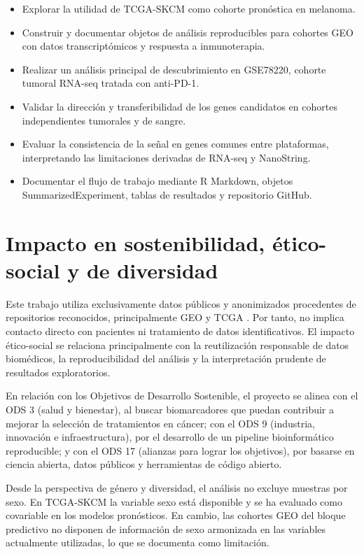 \begin{itemize}
    \item Explorar la utilidad de TCGA-SKCM como cohorte pronóstica en melanoma.
    \item Construir y documentar objetos de análisis reproducibles para cohortes GEO con datos transcriptómicos y respuesta a inmunoterapia.
    \item Realizar un análisis principal de descubrimiento en GSE78220, cohorte tumoral RNA-seq tratada con anti-PD-1.
    \item Validar la dirección y transferibilidad de los genes candidatos en cohortes independientes tumorales y de sangre.
    \item Evaluar la consistencia de la señal en genes comunes entre plataformas, interpretando las limitaciones derivadas de RNA-seq y NanoString.
    \item Documentar el flujo de trabajo mediante R Markdown, objetos SummarizedExperiment, tablas de resultados y repositorio GitHub.
\end{itemize}

\section{Impacto en sostenibilidad, ético-social y de diversidad}
\label{s:etic}

Este trabajo utiliza exclusivamente datos públicos y anonimizados procedentes de repositorios reconocidos, principalmente GEO y TCGA \cite{GEO,TCGA}. Por tanto, no implica contacto directo con pacientes ni tratamiento de datos identificativos. El impacto ético-social se relaciona principalmente con la reutilización responsable de datos biomédicos, la reproducibilidad del análisis y la interpretación prudente de resultados exploratorios.

En relación con los Objetivos de Desarrollo Sostenible, el proyecto se alinea con el ODS 3 (salud y bienestar), al buscar biomarcadores que puedan contribuir a mejorar la selección de tratamientos en cáncer; con el ODS 9 (industria, innovación e infraestructura), por el desarrollo de un pipeline bioinformático reproducible; y con el ODS 17 (alianzas para lograr los objetivos), por basarse en ciencia abierta, datos públicos y herramientas de código abierto.

Desde la perspectiva de género y diversidad, el análisis no excluye muestras por sexo. En TCGA-SKCM la variable sexo está disponible y se ha evaluado como covariable en los modelos pronósticos. En cambio, las cohortes GEO del bloque predictivo no disponen de información de sexo armonizada en las variables actualmente utilizadas, lo que se documenta como limitación.

